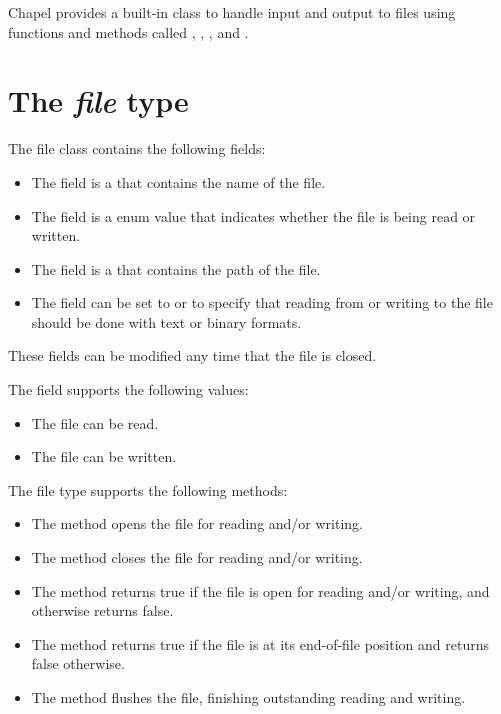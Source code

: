 \label{Input_and_Output}

Chapel provides a built-in  class to handle input and
output to files using functions and methods
called , ,
, and .

\section{The {\em file} type}

The file class contains the following fields:
\begin{itemize}
\item
The  field is a  that contains the name of
the file.
\item
The  field is a  enum value that indicates
whether the file is being read or written.
\item
The  field is a  that contains the path of the
file.
\item
The  field can be set to  or  to
specify that reading from or writing to the file should be done with
text or binary formats.
\end{itemize}
These fields can be modified any time that the file is closed.

The  field supports the following  values:
\begin{itemize}
\item
{} The file can be read.
\item
{} The file can be written.
\end{itemize}

The file type supports the following methods:
\begin{itemize}
\item
The  method opens the file for reading and/or writing.
\item
The  method closes the file for reading and/or writing.
\item
The  method returns true if the file is open for reading
and/or writing, and otherwise returns false.
\item
The  method returns true if the file is at its end-of-file
position and returns false otherwise.
\item
The  method flushes the file, finishing outstanding
reading and writing.
\end{itemize}

